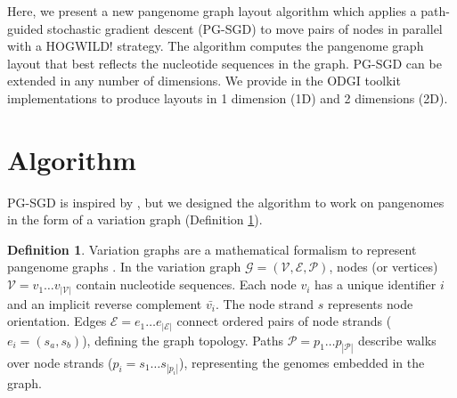\documentclass{bioinfo}
\theoremstyle{definition}
\newtheorem{definition}{Definition}[section]
\newcommand{\red}[1]{{\textcolor{Red}{#1}}}
\newcommand{\FIXME}[1]{\red{[FIXME: #1]}}
\begin{document}
	Here, we present a new pangenome graph layout algorithm which applies a path-guided stochastic gradient descent (PG-SGD) to move pairs of nodes in parallel with a HOGWILD! strategy.
	The algorithm computes the pangenome graph layout that best reflects the nucleotide sequences in the graph.
	PG-SGD can be extended in any number of dimensions. We provide in the ODGI toolkit \citep{Guarracino2022} implementations to produce layouts in 1 dimension (1D) and 2 dimensions (2D).

	\section{Algorithm}
	
	PG-SGD is inspired by \cite{Zheng2019}, but we designed the algorithm to work on pangenomes in the form of a variation graph (Definition \ref{def:vg}).

	\begin{definition}
		\label{def:vg}
		Variation graphs are a mathematical formalism to represent pangenome graphs \citep{Garrison_2019_thesis}.
		In the variation graph $\mathcal{G} = (\mathcal{V}, \mathcal{E}, \mathcal{P})$, nodes (or vertices) $\mathcal{V} = v_1\ldots v_{|\mathcal{V}|}$ contain nucleotide sequences.
		Each node $v_i$ has a unique identifier $i$ and an implicit reverse complement $\bar{v_i}$.
		The node strand $s$ represents node orientation.
		Edges $\mathcal{E} = e_1\ldots e_{|\mathcal{E}|}$ connect ordered pairs of node strands ($e_i = ( s_a, s_b )$), defining the graph topology.
		Paths $\mathcal{P} = p_1\ldots p_{|\mathcal{P}|}$ describe walks over node strands ($p_i = s_1 \ldots s_{|p_i|}$), representing the genomes embedded in the graph.
	\end{definition}
\end{document}
